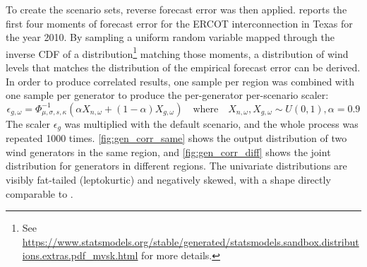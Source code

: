 \documentclass[11pt,a4paper]{article}
\numberwithin{equation}{section}
\begin{document}
To create the scenario sets, reverse forecast error was then applied. 
\cite{hodgeWindPowerForecasting2012} reports the first four moments of forecast error for the ERCOT interconnection in Texas for the year 2010.
By sampling a uniform random variable mapped through the inverse CDF of a distribution\footnote{
See \url{https://www.statsmodels.org/stable/generated/statsmodels.sandbox.distributions.extras.pdf_mvsk.html} for more details.
} matching those moments, a distribution of wind levels that matches the distribution of the empirical forecast error can be derived. 
In order to produce correlated results, one sample per region was combined with one sample per generator to produce the per-generator per-scenario scaler:
\begin{equation}
\epsilon_{g,\omega} = \Phi^{-1}_{\mu,\sigma,s,\kappa} \left( \alpha X_{n,\omega} + (1 - \alpha) X_{g,\omega} \right) \quad \text{where} \quad X_{n,\omega}, X_{g,\omega} \sim U(0,1), \alpha=0.9
\end{equation}
The scaler $\epsilon_g$ was multiplied with the default scenario, and the whole process was repeated 1000 times.
\cref{fig:gen_corr_same} shows the output distribution of two wind generators in the same region, and \cref{fig:gen_corr_diff} shows the joint distribution for generators in different regions.
The univariate distributions are visibly fat-tailed (leptokurtic) and negatively skewed, with a shape directly comparable to \cite{hodgeWindPowerForecasting2012}.
\end{document}
